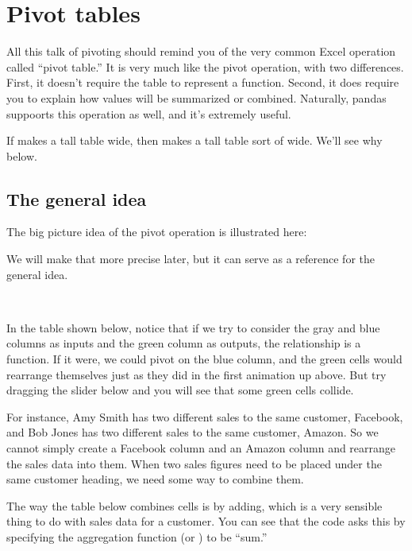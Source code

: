 \documentclass[letterpaper,10pt,english]{sphinxmanual}
\begin{document}
\section{Pivot tables}
\label{\detokenize{chapter-6-single-table-verbs:pivot-tables}}
All this talk of pivoting should remind you of the very common Excel operation called “pivot table.”  It is very much like the pivot operation, with two differences.  First, it doesn’t require the table to represent a function.  Second, it does require you to explain how values will be summarized or combined.  Naturally, pandas suppoorts this operation as well, and it’s extremely useful.

If  makes a tall table wide, then  makes a tall table sort of wide.  We’ll see why below.


\subsection{The general idea}
\label{\detokenize{chapter-6-single-table-verbs:id2}}
The big picture idea of the pivot operation is illustrated here:



We will make that more precise later, but it can serve as a reference for the general idea.

 

In the table shown below, notice that if we try to consider the gray and blue columns as inputs and the green column as outputs, the relationship is  a function.  If it were, we could pivot on the blue column, and the green cells would rearrange themselves just as they did in the first animation up above.  But try dragging the slider below  and you will see that some green cells collide.

For instance, Amy Smith has two different sales to the same customer, Facebook, and Bob Jones has two different sales to the same customer, Amazon.  So we cannot simply create a Facebook column and an Amazon column and rearrange the sales data into them.  When two sales figures need to be placed under the same customer heading, we need some way to combine them.

The way the table below combines cells is by adding, which is a very sensible thing to do with sales data for a customer.  You can see that the code asks this by specifying the aggregation function (or ) to be “sum.”
\end{document}
